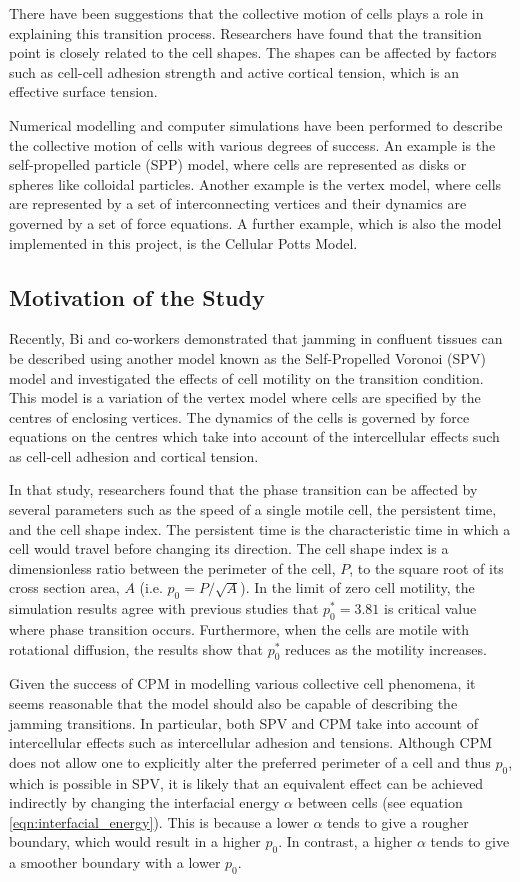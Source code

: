 \documentclass[a4paper,12pt]{article}
\begin{document}
There have been suggestions that the collective motion of cells plays a role in explaining this transition process. Researchers have found that the transition point is closely related to the cell shapes\cite{bi-density2015}. The shapes can be affected by factors such as cell-cell adhesion strength and active cortical tension, which is an effective surface tension.

Numerical modelling and computer simulations have been performed to describe the collective motion of cells with various degrees of success. An example is the self-propelled particle (SPP) model, where cells are represented as disks or spheres like colloidal particles. Another example is the vertex model, where cells are represented by a set of interconnecting vertices and their dynamics are governed by a set of force equations. A further example, which is also the model implemented in this project, is the Cellular Potts Model.


\subsection{Motivation of the Study}
Recently, Bi and co-workers demonstrated that jamming in confluent tissues can be described using another model known as the Self-Propelled Voronoi (SPV) model and investigated the effects of cell motility on the transition condition\cite{bimotility-driven2015}. This model is a variation of the vertex model where cells are specified by the centres of enclosing vertices. The dynamics of the cells is governed by force equations on the centres which take into account of the intercellular effects such as cell-cell adhesion and cortical tension.

In that study, researchers found that the phase transition can be affected by several parameters such as the speed of a single motile cell, the persistent time, and the cell shape index. The persistent time is the characteristic time in which a cell would travel before changing its direction. The cell shape index is a dimensionless ratio between the perimeter of the cell, $P$, to the square root of its cross section area, $A$ (i.e. $p_0=P/\sqrt{A}$). In the limit of zero cell motility, the simulation results agree with previous studies that $p_0^*=3.81$ is critical value where phase transition occurs. Furthermore, when the cells are motile with rotational diffusion, the results show that $p_0^*$ reduces as the motility increases.  

Given the success of CPM in modelling various collective cell phenomena, it seems reasonable that the model should also be capable of describing the jamming transitions. In particular, both SPV and CPM take into account of intercellular effects such as intercellular adhesion and tensions. Although CPM does not allow one to explicitly alter the preferred perimeter of a cell and thus $p_0$, which is possible in SPV, it is likely that an equivalent effect can be achieved indirectly by changing the interfacial energy $\alpha$ between cells (see equation \ref{eqn:interfacial_energy}). This is because a lower $\alpha$ tends to give a rougher boundary, which would result in a higher $p_0$. In contrast, a higher $\alpha$ tends to give a smoother boundary with a lower $p_0$. 
\end{document}
